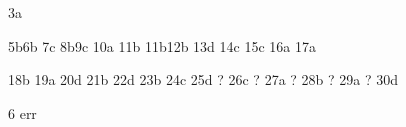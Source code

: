 


3a

5b6b
7c
8b9c
10a
11b
11b12b
13d
14c
15c
16a
17a


18b
19a
20d
21b
22d
23b
24c
25d ?
26c ?
27a ?
28b ?
29a ?
30d

6 err